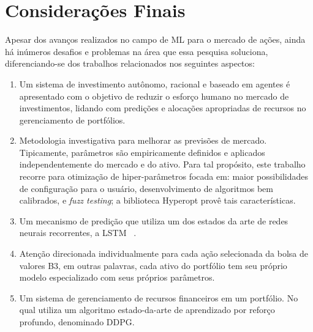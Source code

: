 \section{Considerações Finais}

Apesar dos avanços realizados no campo de \acrshort{ML} para o mercado de ações, ainda há inúmeros desafios e problemas na área que essa pesquisa soluciona, diferenciando-se dos trabalhos relacionados nos seguintes aspectos:

 \begin{enumerate}
  \item \label{ASPECT:1} Um sistema de investimento autônomo, racional e baseado em agentes é apresentado com o objetivo de reduzir o esforço humano no mercado de investimentos, lidando com predições e alocações apropriadas de recursos no gerenciamento de portfólios.
  
  \item \label{ASPECT:2} Metodologia investigativa para melhorar as previsões de mercado. Tipicamente, parâmetros são empiricamente definidos e aplicados independentemente do mercado e do ativo. Para tal propósito, este trabalho recorre para otimização de hiper-parâmetros focada em: maior possibilidades de configuração para o usuário, desenvolvimento de algoritmos bem calibrados, e \emph{fuzz testing}; a biblioteca Hyperopt \cite{hyperopt} provê tais características.
  
  \item \label{ASPECT:3} Um mecanismo de predição que utiliza um dos estados da arte de redes neurais recorrentes, a LSTM ~\cite{ga_optimized_lstm}.
  
  \item \label{ASPECT:4} Atenção direcionada individualmente para cada ação selecionada da bolsa de valores B3, em outras palavras, cada ativo do portfólio tem seu próprio modelo especializado com seus próprios parâmetros.
  
   \item \label{ASPECT:5} Um sistema de gerenciamento de recursos financeiros em um portfólio. No qual utiliza um algoritmo estado-da-arte de aprendizado por reforço profundo, denominado \acrlong{DDPG}.
\end{enumerate}

